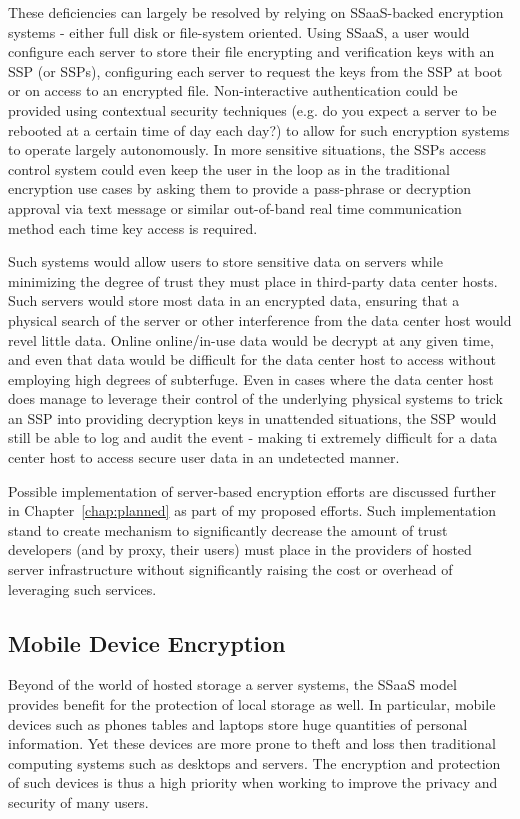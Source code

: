 These deficiencies can largely be resolved by relying on SSaaS-backed
encryption systems - either full disk or file-system oriented. Using
SSaaS, a user would configure each server to store their file
encrypting and verification keys with an SSP (or SSPs), configuring
each server to request the keys from the SSP at boot or on access to
an encrypted file. Non-interactive authentication could be provided
using contextual security techniques (e.g. do you expect a server to
be rebooted at a certain time of day each day?) to allow for such
encryption systems to operate largely autonomously. In more sensitive
situations, the SSPs access control system could even keep the user in
the loop as in the traditional encryption use cases by asking them to
provide a pass-phrase or decryption approval via text message or
similar out-of-band real time communication method each time key
access is required.

Such systems would allow users to store sensitive data on servers
while minimizing the degree of trust they must place in third-party
data center hosts. Such servers would store most data in an encrypted
data, ensuring that a physical search of the server or other
interference from the data center host would revel little data. Online
online/in-use data would be decrypt at any given time, and even that
data would be difficult for the data center host to access without
employing high degrees of subterfuge. Even in cases where the data
center host does manage to leverage their control of the underlying
physical systems to trick an SSP into providing decryption keys in
unattended situations, the SSP would still be able to log and audit
the event - making ti extremely difficult for a data center host to
access secure user data in an undetected manner.

Possible implementation of server-based encryption efforts are
discussed further in Chapter~\ref{chap:planned} as part of my
proposed efforts. Such implementation stand to create mechanism to
significantly decrease the amount of trust developers (and by proxy,
their users) must place in the providers of hosted server
infrastructure without significantly raising the cost or overhead of
leveraging such services.

\subsection{Mobile Device Encryption}

Beyond of the world of hosted storage a server systems, the SSaaS
model provides benefit for the protection of local storage as well.
In particular, mobile devices such as phones tables and laptops store
huge quantities of personal information. Yet these devices are more
prone to theft and loss then traditional computing systems such as
desktops and servers. The encryption and protection of such devices is
thus a high priority when working to improve the privacy and security
of many users.

